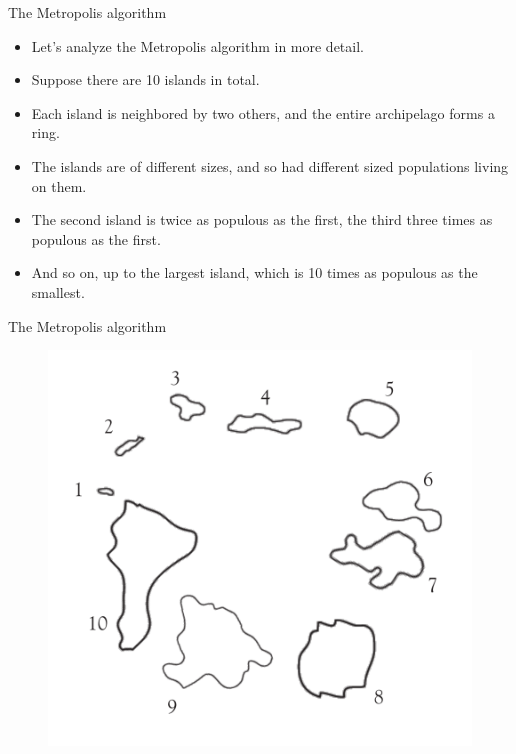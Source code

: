 \documentclass[handout]{beamer}
\begin{document}
\begin{frame}{The Metropolis algorithm}
\scriptsize{

\begin{itemize}
\item Let's analyze the Metropolis algorithm in more detail.
\item Suppose there are 10 islands in total.
\item Each island is neighbored by two others, and the
entire archipelago forms a ring.
\item The islands are of different sizes, and so had different sized populations living on them.
\item The second island is twice as populous as the first,
the third three times as populous as the first.
\item And so on, up to the largest island, which is 10 times as populous as the smallest.

\end{itemize}


} 
\end{frame}


\begin{frame}{The Metropolis algorithm}

   \begin{figure}[h!]
	\centering
	\includegraphics[scale=0.5]{pics/islands.png}
	\end{figure} 

\end{frame}
\end{document}
